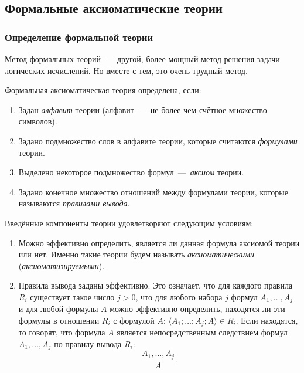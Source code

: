 \subsection{Формальные аксиоматические теории}
\subsubsection{Определение формальной теории}
Метод формальных теорий~---~другой, более мощный метод решения задачи логических исчислений. Но вместе с тем, это очень трудный метод.

Формальная аксиоматическая теория определена, если:
\begin{enumerate}
    \item Задан \textit{алфавит} теории (алфавит~---~не более чем счётное множество символов).
    \item Задано подмножество слов в алфавите теории, которые считаются \textit{формулами} теории.
    \item Выделено некоторое подмножество формул~---~\textit{аксиом} теории.
    \item Задано конечное множество отношений между формулами теории, которые называются \textit{правилами вывода}.
\end{enumerate}

Введённые компоненты теории удовлетворяют следующим условиям:
\begin{enumerate}
    \item Можно эффективно определить, является ли данная формула аксиомой теории или нет. Именно такие теории будем называть \textit{аксиоматическими} (\textit{аксиоматизируемыми}).
    \item Правила вывода заданы эффективно. Это означает, что для каждого правила $R_i$ существует такое число $j > 0$, что для любого набора $j$ формул $A_1, \dots, A_j$ и для любой формулы $A$ можно эффективно определить, находятся ли эти формулы в отношении $R_i$ с формулой $A$: $\langle A_1; \dots; A_j; A\rangle \in R_i$. Если находятся, то говорят, что формула $A$ является непосредственным следствием формул $A_1, \dots, A_j$ по правилу вывода $R_i$:
    \[
        \frac{A_1, \dots, A_j}{A}.
    \]
\end{enumerate}

